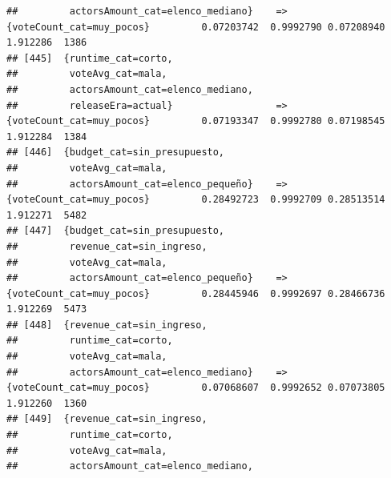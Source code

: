 \documentclass[
]{article}
\begin{document}
\begin{verbatim}
##         actorsAmount_cat=elenco_mediano}    => {voteCount_cat=muy_pocos}         0.07203742  0.9992790 0.07208940 1.912286  1386
## [445]  {runtime_cat=corto,                                                                                                      
##         voteAvg_cat=mala,                                                                                                       
##         actorsAmount_cat=elenco_mediano,                                                                                        
##         releaseEra=actual}                  => {voteCount_cat=muy_pocos}         0.07193347  0.9992780 0.07198545 1.912284  1384
## [446]  {budget_cat=sin_presupuesto,                                                                                             
##         voteAvg_cat=mala,                                                                                                       
##         actorsAmount_cat=elenco_pequeño}    => {voteCount_cat=muy_pocos}         0.28492723  0.9992709 0.28513514 1.912271  5482
## [447]  {budget_cat=sin_presupuesto,                                                                                             
##         revenue_cat=sin_ingreso,                                                                                                
##         voteAvg_cat=mala,                                                                                                       
##         actorsAmount_cat=elenco_pequeño}    => {voteCount_cat=muy_pocos}         0.28445946  0.9992697 0.28466736 1.912269  5473
## [448]  {revenue_cat=sin_ingreso,                                                                                                
##         runtime_cat=corto,                                                                                                      
##         voteAvg_cat=mala,                                                                                                       
##         actorsAmount_cat=elenco_mediano}    => {voteCount_cat=muy_pocos}         0.07068607  0.9992652 0.07073805 1.912260  1360
## [449]  {revenue_cat=sin_ingreso,                                                                                                
##         runtime_cat=corto,                                                                                                      
##         voteAvg_cat=mala,                                                                                                       
##         actorsAmount_cat=elenco_mediano,                                                                                        

\end{verbatim}
\end{document}
